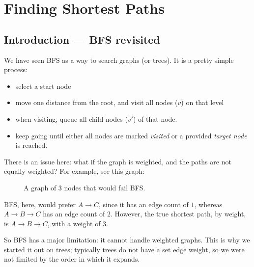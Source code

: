 \chapter{Finding Shortest Paths}
\section{Introduction — BFS revisited}

We have seen BFS as a way to search graphs (or trees). It is a pretty simple process: 
\begin{itemize}
    \item select a start node
    \item move one distance from the root, and visit all nodes ($v$) on that level
    \item when visiting, queue all child nodes ($v'$) of that node.
    \item keep going until either all nodes are marked \emph{visited} or a provided \emph{target node} is reached.
\end{itemize}

There is an issue here: what if the graph is weighted, and the paths are not equally weighted? For example, see this graph:
\begin{figure}[H]
  \centering

  \caption{A graph of 3 nodes that would fail BFS.}
  \label{fig:weighted_abc}
\end{figure}

BFS, here, would prefer $A \rightarrow C$, since it has an edge count of $1$, whereas $A \rightarrow B \rightarrow C$ has an edge count of $2$. However, the true shortest path, by weight, is $A \rightarrow B \rightarrow C$, with a weight of $3$. 

So BFS has a major limitation: it cannot handle weighted graphs. This is why we started it out on trees; typically trees do not have a set edge weight, so we were not limited by the order in which it expands. 

